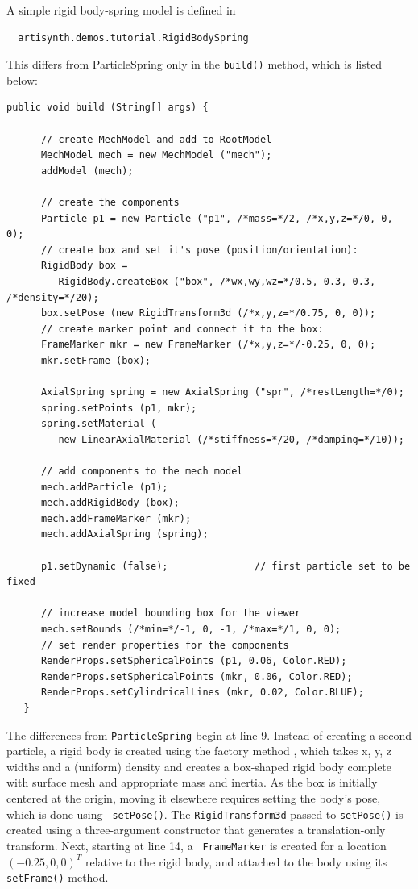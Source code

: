 A simple rigid body-spring model is defined in
%
\begin{verbatim}
  artisynth.demos.tutorial.RigidBodySpring
\end{verbatim}
%
This differs from ParticleSpring only in the {\tt build()} method,
which is listed below:
\lstset{numbers=left}
\begin{lstlisting}[]
   public void build (String[] args) {

      // create MechModel and add to RootModel
      MechModel mech = new MechModel ("mech");
      addModel (mech);

      // create the components
      Particle p1 = new Particle ("p1", /*mass=*/2, /*x,y,z=*/0, 0, 0);
      // create box and set it's pose (position/orientation):
      RigidBody box =
         RigidBody.createBox ("box", /*wx,wy,wz=*/0.5, 0.3, 0.3, /*density=*/20);
      box.setPose (new RigidTransform3d (/*x,y,z=*/0.75, 0, 0));
      // create marker point and connect it to the box:
      FrameMarker mkr = new FrameMarker (/*x,y,z=*/-0.25, 0, 0);
      mkr.setFrame (box);

      AxialSpring spring = new AxialSpring ("spr", /*restLength=*/0);
      spring.setPoints (p1, mkr);
      spring.setMaterial (
         new LinearAxialMaterial (/*stiffness=*/20, /*damping=*/10));

      // add components to the mech model
      mech.addParticle (p1);
      mech.addRigidBody (box);
      mech.addFrameMarker (mkr);
      mech.addAxialSpring (spring);

      p1.setDynamic (false);               // first particle set to be fixed

      // increase model bounding box for the viewer
      mech.setBounds (/*min=*/-1, 0, -1, /*max=*/1, 0, 0);  
      // set render properties for the components
      RenderProps.setSphericalPoints (p1, 0.06, Color.RED);
      RenderProps.setSphericalPoints (mkr, 0.06, Color.RED);
      RenderProps.setCylindricalLines (mkr, 0.02, Color.BLUE);
   }
\end{lstlisting}
\lstset{numbers=none} 
The differences from {\tt ParticleSpring} begin
at line 9. Instead of creating a second particle, a rigid body is
created using the factory method
, which
takes x, y, z widths and a (uniform) density and creates a box-shaped
rigid body complete with surface mesh and appropriate mass and
inertia. As the box is initially centered at the origin, moving it
elsewhere requires setting the body's pose, which is done using {\tt
setPose()}. The {\tt RigidTransform3d} passed to {\tt setPose()} is
created using a three-argument constructor that generates a
translation-only transform.  Next, starting at line 14, a {\tt
FrameMarker} is created for a location $(-0.25, 0, 0)^T$ relative to the
rigid body, and attached to the body using its {\tt setFrame()}
method.

